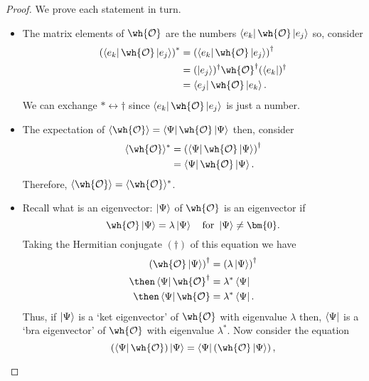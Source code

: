 \documentclass[12pt, a4paper]{article}
\begin{document}
\begin{proof}
    We prove each statement in turn.
    \begin{itemize}
        \item The matrix elements of \(\wh{\mathcal{O}}\) are the numbers \(\bra{e_k} \wh{\mathcal{O}} \ket{e_j}\) so, consider 
        \[\begin{aligned}
            \left( \bra{e_k} \wh{\mathcal{O}} \ket{e_j} \right)^* &= \left( \bra{e_k} \wh{\mathcal{O}} \ket{e_j} \right)^{\dagger} \\
            &=  (\ket{e_j})^{\dagger}\wh{\mathcal{O}}^{\dagger} (\bra{e_k})^{\dagger} \\
            &= \bra{e_j} \wh{\mathcal{O}} \ket{e_k}.
        \end{aligned}\]
        We can exchange \(* \leftrightarrow \dagger\) since \(\bra{e_k} \wh{\mathcal{O}} \ket{e_j}\) is just a number.
        \item The expectation of \(\langle \wh{\mathcal{O}} \rangle = \bra{\Psi} \wh{\mathcal{O}} \ket{\Psi}\) then, consider 
        \[\begin{aligned}
            \langle \wh{\mathcal{O}} \rangle^* &= \left( \bra{\Psi} \wh{\mathcal{O}} \ket{\Psi} \right)^{\dagger} \\
            &= \bra{\Psi} \wh{\mathcal{O}} \ket{\Psi}.
        \end{aligned}\]
        Therefore, \(\langle \wh{\mathcal{O}} \rangle = \langle \wh{\mathcal{O}} \rangle^*\).
        \item Recall what is an eigenvector: \(\ket{\Psi}\) of \(\wh{\mathcal{O}}\) is an eigenvector if 
        \[\wh{\mathcal{O}}\ket{\Psi} = \lambda \ket{\Psi} \quad \text{for } \ket{\Psi} \neq \bm{0}.\]
        Taking the Hermitian conjugate \((\dagger)\) of this equation we have 
        \[\begin{aligned}
            \left( \wh{\mathcal{O}}\ket{\Psi} \right)^{\dagger}&= \left(  \lambda \ket{\Psi} \right)^{\dagger} \\
            \then \bra{\Psi} {\wh{\mathcal{O}}}^{\dagger} &= \lambda^* \bra{\Psi} \\
            \then \bra{\Psi} \wh{\mathcal{O}} &= \lambda^* \bra{\Psi}.
        \end{aligned}\]
        Thus, if \(\ket{\Psi}\) is a `ket eigenvector' of \(\wh{\mathcal{O}}\) with eigenvalue \(\lambda\) then, \(\bra{\Psi}\) is a `bra eigenvector' of \(\wh{\mathcal{O}}\) with eigenvalue \(\lambda^*\). Now consider the equation
        \[\left( \bra{\Psi}\wh{\mathcal{O}} \right) \ket{\Psi}=\bra{\Psi} \left( \wh{\mathcal{O}} \ket{\Psi} \right),\]

\end{itemize}
\end{proof}
\end{document}
